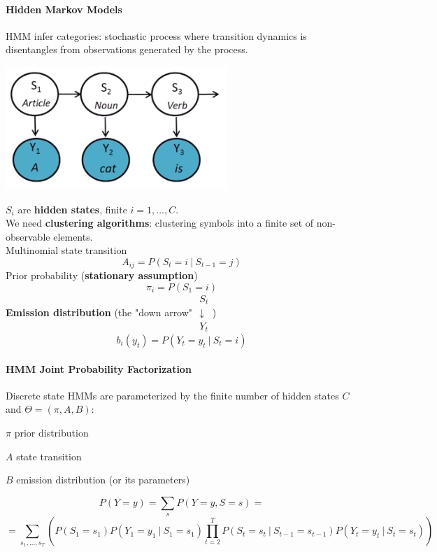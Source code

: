\documentclass[10pt]{report}
\begin{document}
\paragraph{Hidden Markov Models} HMM infer categories: stochastic process where transition dynamics is disentangles from observations generated by the process.\begin{center}
	\includegraphics[scale=0.5]{27.png}
\end{center}
$S_i$ are \textbf{hidden states}, finite $i = 1,\ldots,C$.\\
We need \textbf{clustering algorithms}: clustering symbols into a finite set of non-observable elements.\\
Multinomial state transition
$$A_{ij} = P(S_t=i\:|\:S_{t-1}=j)$$
Prior probability (\textbf{stationary assumption})
$$\pi_i = P(S_1=i)$$
\textbf{Emission distribution} (the "down arrow" $\begin{array}{c}
S_t\\\downarrow\\Y_t
\end{array}$)
$$b_i(y_t) = P(Y_t = y_t\:|\:S_t = i)$$
\paragraph{HMM Joint Probability Factorization} Discrete state HMMs are parameterized by the finite number of hidden states $C$ and $\Theta = (\pi, A, B)$:
\begin{list}{}{}
	\item $\pi$ prior distribution
	\item $A$ state transition
	\item $B$ emission distribution (or its parameters)
\end{list}
$$P(Y = y) = \sum_s P(Y=y,S=s) =$$
$$= \sum_{s_1,\ldots,s_T}\left( P(S_1=s_1)P(Y_1=y_1\:|\:S_1=s_1)\prod_{t=2}^T P(S_t=s_t\:|\:S_{t-1} = s_{t-1})P(Y_t=y_t\:|\:S_t=s_t)\right)$$
\end{document}
